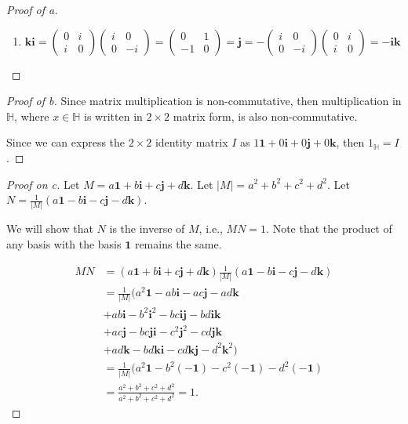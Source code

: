 \documentclass[../hw3]{subfiles}
\begin{document}
\begin{proof}[Proof of a]
\begin{enumerate}[label=(\roman*)]
		\item $\mathbf{k}\mathbf{i}=\begin{pmatrix} 0 & i \\ i & 0 \end{pmatrix}\begin{pmatrix} i & 0 \\ 0 & -i \end{pmatrix}=\begin{pmatrix} 0 & 1 \\ -1 & 0 \end{pmatrix}=\mathbf{j}=-\begin{pmatrix} i & 0 \\ 0 & -i \end{pmatrix}\begin{pmatrix} 0 & i \\ i & 0 \end{pmatrix}=-\mathbf{i}\mathbf{k}$
	\end{enumerate}
\end{proof}
\begin{proof}[Proof of b]
	Since matrix multiplication is non-commutative, then multiplication in $\mathbb{H}$, where $x \in \mathbb{H}$ is written in $2\times 2$ matrix form, is also non-commutative.

	Since we can express the $2\times 2$ identity matrix $I$ as  $1\mathbf{1} + 0\mathbf{i} + 0\mathbf{j} + 0\mathbf{k}$, then $1_{\mathbb{H}}=I$.
\end{proof}
\begin{proof}[Proof on c]
	Let $M=a\mathbf{1} + b\mathbf{i}+c\mathbf{j}+d\mathbf{k}$.
	Let $|M| =a^2 + b^2 + c^2 + d^2$.
	Let $N=\frac{1}{|M|}(a\mathbf{1} -b\mathbf{i}-c\mathbf{j}-d\mathbf{k})$.

	We will show that $N$ is the inverse of $M$, i.e.,  $MN=1$.
	Note that the product of any basis with the basis $\mathbf{1}$ remains the same.

	\begin{align*}
		MN & = ( a\mathbf{1} + b\mathbf{i}+c\mathbf{j}+d\mathbf{k} )\frac{1}{|M|}(a\mathbf{1} -b\mathbf{i}-c\mathbf{j}-d\mathbf{k}) \\
		   & = \frac{1}{|M|}(a^2 \mathbf{1}-ab\mathbf{i}-ac\mathbf{j}-ad\mathbf{k}                                                  \\
		   & + ab\mathbf{i}-b^2\mathbf{i}^2-bc\mathbf{i}\mathbf{j}-bd\mathbf{i}\mathbf{k}                                           \\
		   & +ac\mathbf{j}-bc\mathbf{j}\mathbf{i}-c^2\mathbf{j}^2-cd\mathbf{j}\mathbf{k}                                            \\
		   & + ad\mathbf{k}-bd\mathbf{k}\mathbf{i}-cd\mathbf{k}\mathbf{j}-d^2\mathbf{k}^2)                                          \\
		   & = \frac{1}{|M|}(a^2\mathbf{1}-b^2(-\mathbf{1})-c^2(-\mathbf{1})-d^2(-\mathbf{1})                                       \\
		   & = \frac{a^2+b^2+c^2+d^2}{a^2+b^2+c^2+d^2} = 1
		.\end{align*}
\end{proof}
\end{document}
